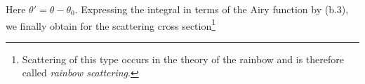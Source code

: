 Here $\theta'=\theta-\theta_0$. Expressing the integral in terms of the Airy function by (b.3), we finally obtain for the scattering cross section\footnote{Scattering of this type occurs in the theory of the rainbow and is therefore called \emph{rainbow scattering}.}
